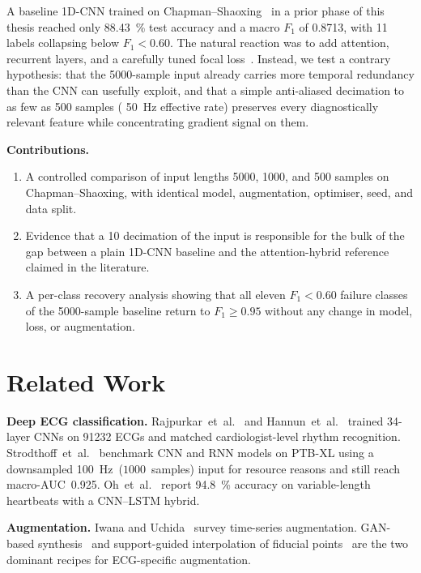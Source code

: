 \documentclass[conference]{IEEEtran}
\begin{document}
A baseline 1D-CNN trained on Chapman--Shaoxing~\cite{zheng2020} in a prior
phase of this thesis reached only \SI{88.43}{\percent} test accuracy and a
macro $F_1$ of \num{0.8713}, with \num{11} labels collapsing below
$F_1 < 0.60$. The natural reaction was to add attention, recurrent layers,
and a carefully tuned focal loss~\cite{lin2017}. Instead, we test a contrary
hypothesis: that the \num{5000}-sample input already carries more temporal
redundancy than the CNN can usefully exploit, and that a simple anti-aliased
decimation to as few as \num{500} samples ( \SI{50}{\hertz} effective rate)
preserves every diagnostically relevant feature while concentrating
gradient signal on them.

\noindent\textbf{Contributions.}
\begin{enumerate}
  \item A controlled comparison of input lengths \num{5000}, \num{1000}, and
        \num{500} samples on Chapman--Shaoxing, with identical model,
        augmentation, optimiser, seed, and data split.
  \item Evidence that a \SI{10}{\times} decimation of the input is
        responsible for the bulk of the gap between a plain 1D-CNN baseline
        and the attention-hybrid reference claimed in the literature.
  \item A per-class recovery analysis showing that all eleven
        $F_1<0.60$ failure classes of the \num{5000}-sample baseline
        return to $F_1\geq 0.95$ without any change in model, loss, or
        augmentation.
\end{enumerate}

\section{Related Work}
\textbf{Deep ECG classification.} Rajpurkar~et~al.~\cite{rajpurkar2017} and
Hannun~et~al.~\cite{hannun2019} trained \num{34}-layer CNNs on
\num{91232} ECGs and matched cardiologist-level rhythm recognition.
Strodthoff~et~al.~\cite{strodthoff2020} benchmark CNN and RNN models on
PTB-XL using a downsampled \SI{100}{\hertz}~($\num{1000}$~samples) input
for resource reasons and still reach macro-AUC~\num{0.925}.
Oh~et~al.~\cite{oh2018} report \SI{94.8}{\percent} accuracy on
variable-length heartbeats with a CNN--LSTM hybrid.

\textbf{Augmentation.} Iwana and Uchida~\cite{iwana2021} survey time-series
augmentation. GAN-based synthesis~\cite{wang2020} and support-guided
interpolation of fiducial points~\cite{chen2021,xu2022} are the two
dominant recipes for ECG-specific augmentation.
\end{document}
